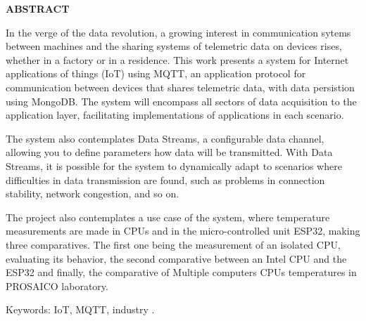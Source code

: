 \begin{center}
\textbf{ABSTRACT}
\end{center}

$\!$\\


In the verge of the data revolution, a growing interest in communication sytems between machines and the sharing systems of telemetric data on devices rises, whether in a factory or in a residence. This work presents a system for Internet applications of things (IoT) using MQTT, an application protocol for communication between devices that shares telemetric data, with data persistion using MongoDB. The system will  encompass all sectors of data acquisition to the application layer, facilitating implementations of applications in each scenario.

The system also contemplates Data Streams, a configurable data channel, allowing you to define parameters how data will be transmitted. With Data Streams, it is possible for the system to dynamically adapt to scenarios where difficulties in data transmission are found, such as problems in connection stability, network congestion, and so on.

The project also contemplates a use case of the system, where temperature measurements are made in CPUs and in the micro-controlled unit ESP32, making three comparatives. The first one being the measurement of an isolated CPU, evaluating its behavior, the second comparative between an Intel CPU and the ESP32 and finally, the comparative of Multiple computers CPUs temperatures in PROSAICO laboratory.

\vspace{1cm}

\hspace{-1.3cm}Keywords: IoT, MQTT, industry .